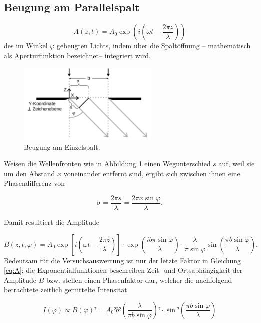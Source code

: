 \subsection{Beugung am Parallelspalt}

\begin{equation}
	A(z,t)=A_0\exp{\left(i\left(\omega t -\frac{2\pi z}{\lambda}\right)\right)}
\end{equation}
des im Winkel $\varphi$ gebeugten Lichts, indem über die Spaltöffnung -- mathematisch als Aperturfunktion bezeichnet-- integriert wird. 

\begin{figure}
	\centering
	\includegraphics[width=0.6\textwidth]{Bilder/Einfachspalt.pdf}
	\caption{Beugung am Einzelspalt.\cite{V406}}
	\label{fig:einzelspalt}
\end{figure}

Weisen die Wellenfronten wie in Abbildung \ref{fig:einzelspalt} einen Wegunterschied $s$ auf, weil sie um den Abstand $x$ voneinander entfernt sind, ergibt sich zwischen ihnen eine Phasendifferenz von

\begin{equation}
	\sigma=\frac{2\pi s}{\lambda}=\frac{2\pi x \sin{\varphi}}{\lambda}.
\end{equation}

Damit resultiert die Amplitude

\begin{equation}
	B(z,t,\varphi)=A_0\exp{\left[i\left(\omega t -\frac{2\pi z}{\lambda}\right)\right]}\cdot \exp{\left(\frac{i b \pi \sin{\varphi}}{\lambda}\right)}\cdot\frac{\lambda}{\pi\sin\varphi}\sin{\left(\frac{\pi b \sin\varphi}{\lambda}\right)}.
	\label{eq:A}
\end{equation}
Bedeutsam für die Versuchsauswertung ist nur der letzte Faktor in Gleichung \eqref{eq:A}; die Exponentialfunktionen beschreiben Zeit- und Ortsabhängigkeit der Amplitude $B$ bzw. stellen einen Phasenfaktor dar, welcher die nachfolgend betrachtete zeitlich gemittelte Intensität

\begin{equation}
	I(\varphi)\propto B(\varphi)²={A_0}²b²\left(\frac{\lambda}{\pi b \sin{\varphi}}\right)²\cdot \sin²{\left(\frac{\pi b \sin\varphi}{\lambda}\right)}
	\label{eq:regress1}
\end{equation}

